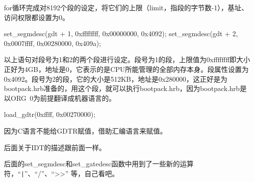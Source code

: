 
for循环完成对8192个段的设定，将它们的上限（limit，指段的字节数-1），基址、访问权限都设置为0。

\begin{code}
    set_segmdesc(gdt + 1, 0xffffffff, 0x00000000, 0x4092);
	set_segmdesc(gdt + 2, 0x0007ffff, 0x00280000, 0x409a);
\end{code}

以上语句对段号为1和2的两个段进行设定。段号为1的段，上限值为0xffffffff即大小正好为4GB，地址是0，它表示的是CPU所能管理的全部内存本身。段属性设置为0x4092。段号为2的段，它的大小是512KB，地址是0x280000，这正好是为bootpack.hrb准备的，用这个段，就可以执行bootpack.hrb，因为bootpack.hrb是以ORG~0为前提翻译成机器语言的。

\begin{code}
  load_gdtr(0xffff, 0x00270000);
\end{code}

因为C语言不能给GDTR赋值，借助汇编语言来赋值。

后面关于IDT的描述跟前面一样。

后面的set\_segmdesc和set\_gatedesc函数中用到了一些新的运算符，“\verb"|"”、“/”、“>>” 等，自己看吧。